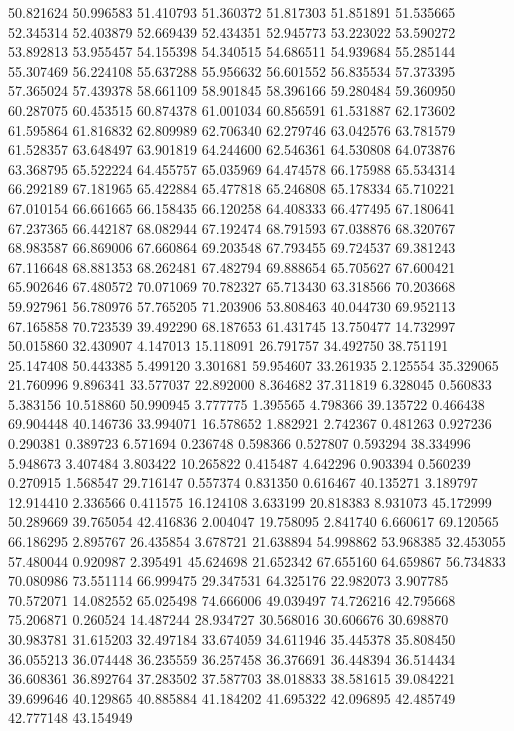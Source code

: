 50.821624
50.996583
51.410793
51.360372
51.817303
51.851891
51.535665
52.345314
52.403879
52.669439
52.434351
52.945773
53.223022
53.590272
53.892813
53.955457
54.155398
54.340515
54.686511
54.939684
55.285144
55.307469
56.224108
55.637288
55.956632
56.601552
56.835534
57.373395
57.365024
57.439378
58.661109
58.901845
58.396166
59.280484
59.360950
60.287075
60.453515
60.874378
61.001034
60.856591
61.531887
62.173602
61.595864
61.816832
62.809989
62.706340
62.279746
63.042576
63.781579
61.528357
63.648497
63.901819
64.244600
62.546361
64.530808
64.073876
63.368795
65.522224
64.455757
65.035969
64.474578
66.175988
65.534314
66.292189
67.181965
65.422884
65.477818
65.246808
65.178334
65.710221
67.010154
66.661665
66.158435
66.120258
64.408333
66.477495
67.180641
67.237365
66.442187
68.082944
67.192474
68.791593
67.038876
68.320767
68.983587
66.869006
67.660864
69.203548
67.793455
69.724537
69.381243
67.116648
68.881353
68.262481
67.482794
69.888654
65.705627
67.600421
65.902646
67.480572
70.071069
70.782327
65.713430
63.318566
70.203668
59.927961
56.780976
57.765205
71.203906
53.808463
40.044730
69.952113
67.165858
70.723539
39.492290
68.187653
61.431745
13.750477
14.732997
50.015860
32.430907
4.147013
15.118091
26.791757
34.492750
38.751191
25.147408
50.443385
5.499120
3.301681
59.954607
33.261935
2.125554
35.329065
21.760996
9.896341
33.577037
22.892000
8.364682
37.311819
6.328045
0.560833
5.383156
10.518860
50.990945
3.777775
1.395565
4.798366
39.135722
0.466438
69.904448
40.146736
33.994071
16.578652
1.882921
2.742367
0.481263
0.927236
0.290381
0.389723
6.571694
0.236748
0.598366
0.527807
0.593294
38.334996
5.948673
3.407484
3.803422
10.265822
0.415487
4.642296
0.903394
0.560239
0.270915
1.568547
29.716147
0.557374
0.831350
0.616467
40.135271
3.189797
12.914410
2.336566
0.411575
16.124108
3.633199
20.818383
8.931073
45.172999
50.289669
39.765054
42.416836
2.004047
19.758095
2.841740
6.660617
69.120565
66.186295
2.895767
26.435854
3.678721
21.638894
54.998862
53.968385
32.453055
57.480044
0.920987
2.395491
45.624698
21.652342
67.655160
64.659867
56.734833
70.080986
73.551114
66.999475
29.347531
64.325176
22.982073
3.907785
70.572071
14.082552
65.025498
74.666006
49.039497
74.726216
42.795668
75.206871
0.260524
14.487244
28.934727
30.568016
30.606676
30.698870
30.983781
31.615203
32.497184
33.674059
34.611946
35.445378
35.808450
36.055213
36.074448
36.235559
36.257458
36.376691
36.448394
36.514434
36.608361
36.892764
37.283502
37.587703
38.018833
38.581615
39.084221
39.699646
40.129865
40.885884
41.184202
41.695322
42.096895
42.485749
42.777148
43.154949
